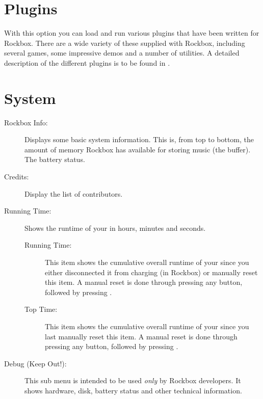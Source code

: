 \section{Plugins}
  With this option you can load and run various plugins that have been
written for Rockbox. There are a wide variety of these supplied with
Rockbox, including several games, some impressive demos and a number of
utilities. A detailed description of the different plugins is to be found in 
.

\section{\label{ref:Info}System}

\begin{description}
\item[Rockbox Info:]
  Displays some basic system information. This is, from top to bottom,
  the amount of memory Rockbox has available for storing music (the buffer).
  The battery status.
%

\item[Credits:]
  Display the list of contributors.

\item[Running Time:]
  Shows the runtime of your \dap{} in hours, minutes and seconds.
  \begin{description}
    \item[Running Time:]
        This item shows the cumulative overall runtime of your \dap{} since you 
        either disconnected it from charging (in Rockbox) or manually 
        reset this item. A manual reset is done through pressing any button, 
        followed by pressing \ActionStdOk{}.
    \item[Top Time:]
        This item shows the cumulative overall runtime of your \dap{} since you 
        last manually reset this item. A manual reset is done through pressing 
        any button, followed by pressing \ActionStdOk{}.
  \end{description}

\item[Debug (Keep Out!):]
  This sub menu is intended to be used \emph{only} by Rockbox developers.
  It shows hardware, disk, battery status and other technical information.  
\end{description}

